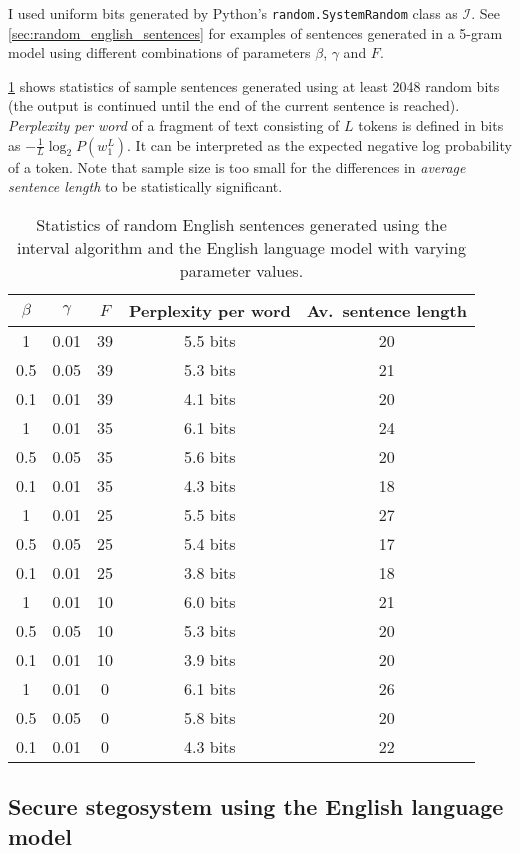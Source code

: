 \documentclass[draft]{IIBproject}
\makeatletter
\DeclareRobustCommand*{\AbbreviationWithDot}[1]{\@ifnextchar{.}{#1}{#1.\@\xspace}}
\DeclareRobustCommand*{\iid}{\AbbreviationWithDot{i.i.d}}
\makeatother
\begin{document}
I used \iid uniform bits generated by Python's \texttt{random.SystemRandom} class as $\mathcal I$. See \cref{sec:random_english_sentences} for examples of sentences generated in a 5-gram model using different combinations of parameters $\beta$, $\gamma$ and $F$.

\cref{tab:random_sentence_statistics} shows statistics of sample sentences generated using at least 2048 random bits (the output is continued until the end of the current sentence is reached). \emph{Perplexity per word} of a fragment of text consisting of $L$ tokens is defined in bits as $- \frac {1}{L} \log_2 P(w_1^L)$. It can be interpreted as the expected negative log probability of a token. Note that sample size is too small for the differences in \emph{average sentence length} to be statistically significant.

\begin{table}[h]
	\centering
	\begin{tabular}{ c | c | c || c | c}
	$\beta$ & $\gamma$ & $F$ & Perplexity per word & Av.\ sentence length \\
	\hline
	1 & 0.01 & 39 & 5.5 bits & 20 \\
	0.5 & 0.05 & 39 & 5.3 bits & 21 \\
	0.1 & 0.01 & 39 & 4.1 bits & 20 \\ \hline
	1 & 0.01 & 35 & 6.1 bits & 24 \\
	0.5 & 0.05 & 35 & 5.6 bits & 20 \\
	0.1 & 0.01 & 35 & 4.3 bits & 18 \\ \hline
	1 & 0.01 & 25 & 5.5 bits & 27 \\
	0.5 & 0.05 & 25 & 5.4 bits & 17 \\
	0.1 & 0.01 & 25 & 3.8 bits & 18 \\ \hline
	1 & 0.01 & 10 & 6.0 bits & 21 \\
	0.5 & 0.05 & 10 & 5.3 bits & 20 \\
	0.1 & 0.01 & 10 & 3.9 bits & 20 \\ \hline
	1 & 0.01 & 0 & 6.1 bits & 26 \\
	0.5 & 0.05 & 0 & 5.8 bits & 20 \\
	0.1 & 0.01 & 0 & 4.3 bits & 22
	\end{tabular}
	\caption{\label{tab:random_sentence_statistics}Statistics of random English sentences generated using the interval algorithm and the English language model with varying parameter values.}
\end{table}

\clearpage
\subsection{Secure stegosystem using the English language model}
\end{document}
